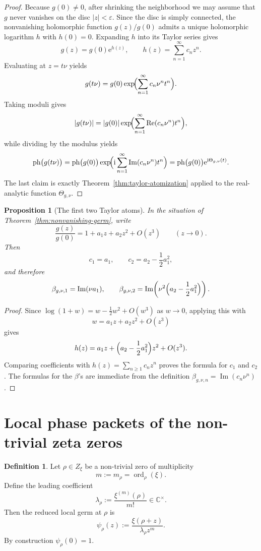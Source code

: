 \documentclass[11pt,a4paper]{article}
\numberwithin{equation}{section}
\newtheorem{proposition}[theorem]{Proposition}
\theoremstyle{definition}
\newtheorem{definition}[theorem]{Definition}
\theoremstyle{remark}
\DeclareMathOperator{\ord}{ord}
\DeclareMathOperator{\Rea}{Re}
\DeclareMathOperator{\Ima}{Im}
\newcommand{\CC}{\mathbb C}
\newcommand{\ph}{\operatorname{ph}}
\newcommand{\e}{\mathrm e}
\newcommand{\ii}{\mathrm i}
\begin{document}
\begin{proof}
Because $g(0)\neq0$, after shrinking the neighborhood we may assume that $g$ never vanishes on the disc $|z|<\varepsilon$.  Since the disc is simply connected, the nonvanishing holomorphic function $g(z)/g(0)$ admits a unique holomorphic logarithm $h$ with $h(0)=0$.  Expanding $h$ into its Taylor series gives
\[
g(z)=g(0)\e^{h(z)},
\qquad
h(z)=\sum_{n=1}^{\infty} c_n z^n.
\]
Evaluating at $z=t\nu$ yields
\[
g(t\nu)=g(0)\exp\!\Bigl(\sum_{n=1}^{\infty} c_n\nu^n t^n\Bigr).
\]
Taking moduli gives
\[
|g(t\nu)|=|g(0)|\exp\!\Bigl(\sum_{n=1}^{\infty}\Rea(c_n\nu^n)t^n\Bigr),
\]
while dividing by the modulus yields
\[
\ph\bigl(g(t\nu)\bigr)=\ph\bigl(g(0)\bigr)\exp\!\Bigl(\ii\sum_{n=1}^{\infty}\Ima(c_n\nu^n)t^n\Bigr)
=\ph\bigl(g(0)\bigr)\e^{\ii\Theta_{g,\nu}(t)}.
\]
The last claim is exactly Theorem~\ref{thm:taylor-atomization} applied to the real-analytic function $\Theta_{g,\nu}$.
\end{proof}

\begin{proposition}[The first two Taylor atoms]\label{prop:first-two-atoms}
In the situation of Theorem~\ref{thm:nonvanishing-germ}, write
\[
\frac{g(z)}{g(0)}=1+a_1 z+a_2 z^2+O(z^3)
\qquad (z\to0).
\]
Then
\[
c_1=a_1,
\qquad
c_2=a_2-\frac12 a_1^2,
\]
and therefore
\[
\beta_{g,\nu,1}=\Ima(\nu a_1),
\qquad
\beta_{g,\nu,2}=\Ima\!\left(\nu^2\Bigl(a_2-\frac12 a_1^2\Bigr)\right).
\]
\end{proposition}

\begin{proof}
Since $\log(1+w)=w-\frac12 w^2+O(w^3)$ as $w\to0$, applying this with
\[
w=a_1 z+a_2 z^2+O(z^3)
\]
gives
\[
h(z)=a_1 z+\Bigl(a_2-\frac12 a_1^2\Bigr)z^2+O(z^3).
\]
Comparing coefficients with $h(z)=\sum_{n\ge1} c_n z^n$ proves the formula for $c_1$ and $c_2$.  The formulas for the $\beta$'s are immediate from the definition $\beta_{g,\nu,n}=\Ima(c_n\nu^n)$.
\end{proof}

\section{Local phase packets of the non-trivial zeta zeros}

\begin{definition}
Let $\rho\in Z_\xi$ be a non-trivial zero of multiplicity
\[
m:=m_\rho=\ord_\rho(\xi).
\]
Define the leading coefficient
\[
\lambda_\rho:=\frac{\xi^{(m)}(\rho)}{m!}\in\CC^\times.
\]
Then the reduced local germ at $\rho$ is
\[
\psi_\rho(z):=\frac{\xi(\rho+z)}{\lambda_\rho z^m}.
\]
By construction $\psi_\rho(0)=1$.
\end{definition}
\end{document}
